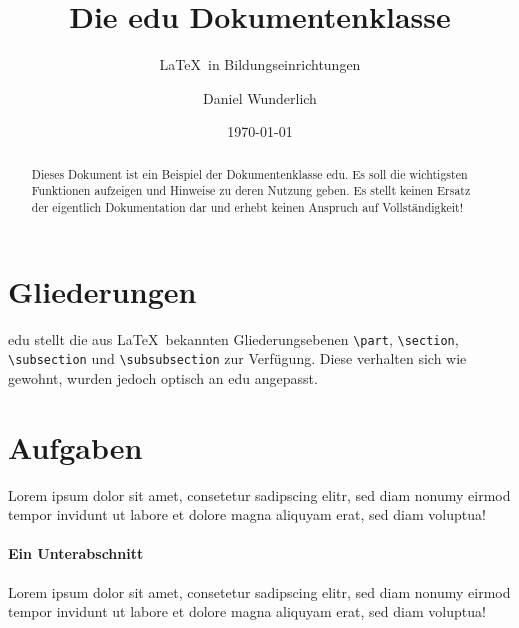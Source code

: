 \documentclass[
parindent=false,
parskip=true,
parts=true,
colortheme=wu,
styletheme=wu,
shownotess=true,
showresults=true
]{edu}
\title[edu Dokumentenklasse]{Die edu Dokumentenklasse}
\subtitle{\LaTeX\ in Bildungseinrichtungen}
\author[D. Wunderlich]{Daniel Wunderlich}
\date[\today*]{\today}
\begin{document}
\makeheader

\maketitle

\begin{abstract}
  Dieses Dokument ist ein Beispiel der Dokumentenklasse \textsf{edu}. Es soll die wichtigsten Funktionen aufzeigen und Hinweise zu deren Nutzung geben. Es stellt keinen Ersatz der eigentlich Dokumentation dar und erhebt keinen Anspruch auf Vollständigkeit!
\end{abstract}

\tableofcontents


\part{Gliederungen}

\textsf{edu} stellt die aus \LaTeX\ bekannten Gliederungsebenen \lstinline!\part!, \lstinline!\section!, \lstinline!\subsection! und \lstinline!\subsubsection! zur Verfügung. Diese verhalten sich wie gewohnt, wurden jedoch optisch an \textsf{edu} angepasst.

\part{Aufgaben}




Lorem ipsum dolor sit amet, consetetur sadipscing elitr, sed diam nonumy eirmod tempor invidunt ut labore et dolore magna aliquyam erat, sed diam voluptua!

\subsection{Ein Unterabschnitt}

Lorem ipsum dolor sit amet, consetetur sadipscing elitr, sed diam nonumy eirmod tempor invidunt ut labore et dolore magna aliquyam erat, sed diam voluptua!
\end{document}
